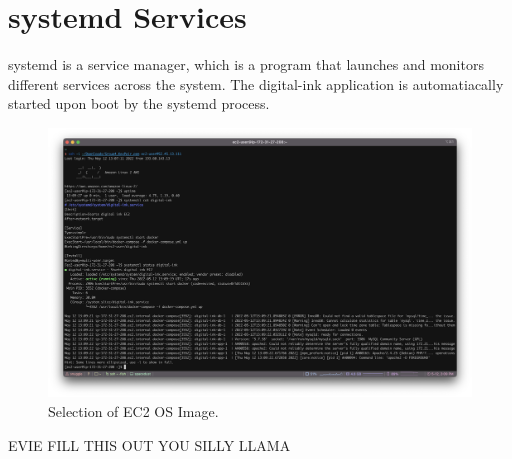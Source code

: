 \section{systemd Services}
systemd is a service manager, which is a program that launches and monitors different services across the system. The digital-ink application is automatiacally started upon boot by the systemd process.


\begin{figure}[!htbp]
    \centering
    \includegraphics[width=\textwidth]{resources/systemd/systemd}
    \caption{Selection of EC2 OS Image.}
    \label{fig:ec2-os}
\end{figure}

EVIE FILL THIS OUT YOU SILLY LLAMA